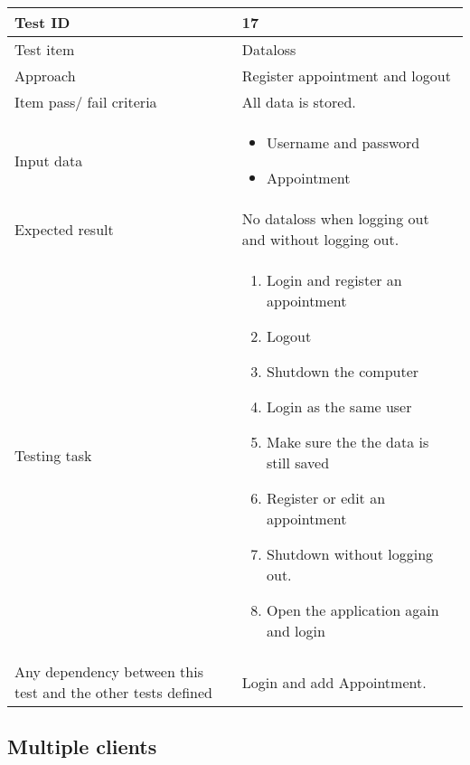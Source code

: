 \documentclass[a4paper, english, 12pt]{article}
\begin{document}
\begin{tabularx}{\textwidth}{ |X|X| }
\hline
\rowcolor{Gray}
Test ID & 17 \\ \hline
Test item & Dataloss \\ \hline
Approach & Register appointment and logout \\ \hline
Item pass/ fail criteria & All data is stored. \\ \hline
Input data & 
\begin{itemize}
	\item Username and password
    \item Appointment
\end{itemize}\\ \hline
Expected result & 
No dataloss when logging out and without logging out.  \\ \hline
Testing task &
\begin{enumerate}
    \item Login and register an appointment
    \item Logout
    \item Shutdown the computer
    \item Login as the same user
    \item Make sure the the data is still saved
    \item Register or edit an appointment
    \item Shutdown without logging out. 
    \item Open the application again and login
\end{enumerate}\\ \hline
    
Any dependency between this test and the other tests defined & Login and  add Appointment. \\ \hline

\end{tabularx}

\subsection{Multiple clients}
\end{document}
